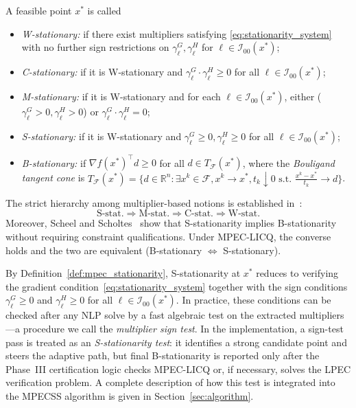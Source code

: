 \begin{definition}\label{def:mpec_stationarity}
A feasible point $x^*$ is called
\begin{itemize}
  \item[-] \emph{W-stationary:} if there exist multipliers satisfying \eqref{eq:stationarity_system} with no further sign restrictions on $\gamma^G_\ell, \gamma^H_\ell$ for $\ell \in \mathcal{I}_{00}(x^*)$;
  \item[-] \emph{C-stationary:} if it is W-stationary and $\gamma^G_\ell \cdot \gamma^H_\ell \geq 0$ for all $\ell \in \mathcal{I}_{00}(x^*)$;
  \item[-] \emph{M-stationary:} if it is W-stationary and for each $\ell \in \mathcal{I}_{00}(x^*)$, either ($\gamma^G_\ell > 0, \gamma^H_\ell > 0$) or $\gamma^G_\ell \cdot \gamma^H_\ell = 0$;
  \item[-] \emph{S-stationary:} if it is W-stationary and $\gamma^G_\ell \geq 0, \gamma^H_\ell \geq 0$ for all $\ell \in \mathcal{I}_{00}(x^*)$;
  \item[-] \emph{B-stationary:} if $\nabla f(x^*)^\top d \geq 0$ for all $d \in T_{\mathcal{F}}(x^*)$, where the \emph{Bouligand tangent cone} is $T_{\mathcal{F}}(x^*) = \{d \in \mathbb{R}^n : \exists x^k \in \mathcal{F}, x^k \to x^*, t_k \downarrow 0 \text{ s.t. } \frac{x^k - x^*}{t_k} \to d\}$.
\end{itemize}
\end{definition}

The strict hierarchy among multiplier-based notions is established in~\citep{ScheelScholtes2000,Ye2005,FlegelKanzow2005}:
\begin{equation}
  \text{S-stat.} \Rightarrow \text{M-stat.} \Rightarrow \text{C-stat.} \Rightarrow \text{W-stat.}
  \label{eq:stat_hierarchy}
\end{equation}
Moreover, Scheel and Scholtes~\citep{ScheelScholtes2000} show that S-stationarity implies B-stationarity without requiring constraint qualifications. Under MPEC-LICQ, the converse holds and the two are equivalent (B-stationary $\Leftrightarrow$ S-stationary).

By Definition~\ref{def:mpec_stationarity}, S-stationarity at $x^*$ reduces to
verifying the gradient condition~\eqref{eq:stationarity_system} together
with the sign conditions $\gamma^G_\ell \geq 0$ and
$\gamma^H_\ell \geq 0$ for all $\ell \in \mathcal{I}_{00}(x^*)$. In
practice, these conditions can be checked after any NLP solve by a fast
algebraic test on the extracted multipliers---a procedure we call the
\emph{multiplier sign test}. In the implementation, a sign-test pass is
treated as an \emph{S-stationarity test}: it identifies a strong
candidate point and steers the adaptive path, but final B-stationarity
is reported only after the Phase~III certification logic checks
MPEC-LICQ or, if necessary, solves the LPEC verification problem. A
complete description of how this test is integrated into the MPECSS
algorithm is given in Section~\ref{sec:algorithm}.


